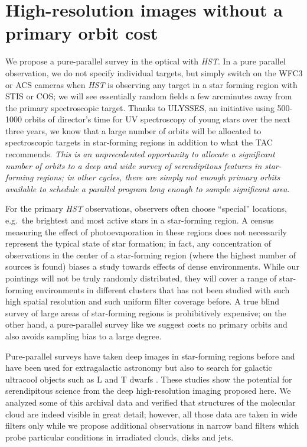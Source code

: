 \documentclass[12pt]{article}
\begin{document}
\section{High-resolution images without a primary orbit cost}
We propose a pure-parallel survey in the optical with \emph{HST}. In a pure
parallel observation, we do not specify individual targets, but simply switch
on the WFC3 or ACS cameras when \emph{HST} is observing any target in a star
forming region with STIS or COS; we will see essentially random fields a few
arcminutes away from the primary spectroscopic target. Thanks to ULYSSES, an
initiative using 500-1000 orbits of director's time for UV spectroscopy of
young stars over the next three years, we know that a large number of orbits
will be allocated to spectroscopic targets in star-forming regions in addition
to what the TAC recommends. \emph{This is an unprecedented opportunity to allocate a significant number of orbits to a deep and wide survey of serendipitous features in star-forming regions; in other cycles, there are simply not enough primary orbits available to schedule a parallel program long enough to sample significant area.}

For the primary
\emph{HST} observations, observers often choose ``special'' locations,
e.g.\ the brightest and most active stars in a star-forming region. A census
measuring the effect of photoevaporation in these regions does not necessarily
represent the typical state of star formation; in fact, any concentration of
observations in the center of a star-forming region (where the highest number
of sources is found) biases a study towards effects of dense
environments. While our pointings will not be truly randomly distributed, they
will cover a range of star-forming environments in different clusters that has
not been studied with such high spatial resolution and such uniform filter
coverage before. A true blind survey of large areas of star-forming regions is prohibitively expensive; on the other hand, a pure-parallel survey like we suggest costs no primary orbits and also avoids sampling bias to a large degree.

Pure-parallel surveys have taken deep images in star-forming regions before and
have been used for extragalactic astronomy \citep{2007A&A...468..823S} but also
to search for galactic ultracool objects such as L and T dwarfs
\citep{2005ApJ...631L.159R}. These studies show the potential for serendipitous
science from the deep high-resolution imaging proposed here. We analyzed some of this archival data and verified that structures of the
molecular cloud are indeed visible in great detail; however, all those data are
taken in wide filters only while we propose additional observations in narrow
band filters which probe particular conditions in irradiated clouds, disks and
jets.
\end{document}
